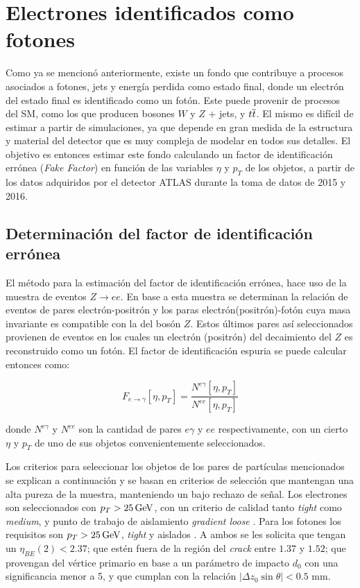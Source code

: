 \chapter{Electrones identificados como fotones}\label{ch:e_fake}


Como ya se mencionó anteriormente, existe un fondo que contribuye a procesos asociados a fotones, jets y energía perdida como estado final, donde un electrón del estado final es identificado como un fotón. Este puede provenir de procesos del SM, como los que producen bosones $W$ y $Z$ + jets, y $t \overline{t}$. El mismo es difícil de estimar a partir de simulaciones, ya que depende en gran medida de la estructura y material del detector que es muy compleja de modelar en todos sus detalles. El objetivo es entonces estimar este fondo calculando un factor de identificación errónea (\textit{Fake Factor}) en función de las variables $\eta$ y $p_{T}$ de los objetos, a partir de los datos adquiridos por el detector ATLAS durante la toma de datos de 2015 y 2016.

\section{Determinación del factor de identificación errónea}

El método para la estimación del factor de identificación errónea, hace uso de la muestra de eventos $Z\rightarrow ee$. En base a esta muestra se determinan la relación de eventos de pares electrón-positrón y los paras electrón(positrón)-fotón cuya masa invariante es compatible con la del bosón $Z$. Estos últimos pares así seleccionados provienen de eventos en los cuales un electrón (positrón) del decaimiento del $Z$ es reconstruido como un fotón. El factor de identificación espuria se puede calcular entonces como: 

\begin{equation}
F_{e\rightarrow\gamma}[\eta , p_{T}]=\frac{N^{e\gamma}[\eta , p_{T}]}{N^{ee}[\eta , p_{T}]} \label{eq:ff_ratio}
\end{equation}

\noindent
donde $N^{e\gamma}$ y $N^{ee}$ son la cantidad de pares $e\gamma$ y $ee$ respectivamente, con un cierto $\eta$ y $p_{T}$ de uno de sus objetos convenientemente seleccionados.

Los criterios para seleccionar los objetos de los pares de partículas mencionados se explican a continuación y se basan en criterios de selección que mantengan una alta pureza de la muestra, manteniendo un bajo rechazo de señal.
Los electrones  son seleccionados con $p_{T} > 25 \, \mathrm{GeV}$, con un criterio de calidad tanto \textit{tight} como \textit{medium}, y punto de trabajo de aislamiento \textit{gradient loose} \cite{ATLAS-CONF-2016-024}. Para los fotones los requisitos son $p_{T} > 25 \, \mathrm{GeV}$, \textit{tight} y aislados \cite{STDM-2010-08}. A ambos se les solicita que tengan un $\eta_{BE}(2)<2.37$; que estén fuera de la región del \textit{crack} entre $1.37$ y $1.52$; que provengan del vértice primario en base a un parámetro de impacto $d_{0}$ con una significancia menor a 5, y que cumplan con la relación $|\Delta z_{0}\sin\theta|<0.5$ mm.

